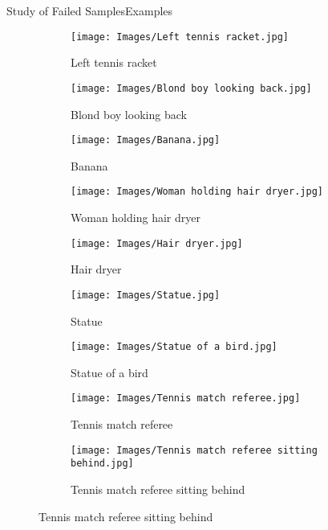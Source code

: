 \documentclass{beamer}
\begin{document}
\begin{frame}{Study of Failed Samples}{Examples}
  \vspace*{-.75cm}
  \begin{figure}
    \begin{subfigure}[t]{.32\textwidth}
      \centering
      \caption{Left tennis racket}\label{fig:racket}
      \texttt{[image: Images/Left tennis racket.jpg]}
    \end{subfigure}\hfill
    \begin{subfigure}[t]{.32\textwidth}
      \centering
      \caption{Blond boy looking back}\label{fig:blond}
      \texttt{[image: Images/Blond boy looking back.jpg]}
    \end{subfigure}\hfill
    \begin{subfigure}[t]{.32\textwidth}
      \centering
      \caption{Banana}\label{fig:banana}
      \texttt{[image: Images/Banana.jpg]}
    \end{subfigure}

    \bigskip
    \begin{subfigure}[t]{.32\textwidth}
      \centering
      \caption{Woman holding hair dryer}\label{fig:dryer-1}
      \texttt{[image: Images/Woman holding hair dryer.jpg]}
    \end{subfigure}\hspace{.1\textwidth}
    \begin{subfigure}[t]{.32\textwidth}
      \centering
      \caption{Hair dryer}\label{fig:dryer-2}
      \texttt{[image: Images/Hair dryer.jpg]}
    \end{subfigure}

    \bigskip
    \begin{subfigure}[t]{.4\textwidth}
      \centering
      \caption{Statue}\label{fig:statue-1}
      \texttt{[image: Images/Statue.jpg]}
    \end{subfigure}\hspace{.06\textwidth}
    \begin{subfigure}[t]{.4\textwidth}
      \centering
      \caption{Statue of a bird}\label{fig:statue-2}
      \texttt{[image: Images/Statue of a bird.jpg]}
    \end{subfigure}

    \bigskip
    \begin{subfigure}[t]{.45\textwidth}
      \centering
      \caption{Tennis match referee}\label{fig:referee-1}
      \texttt{[image: Images/Tennis match referee.jpg]}
    \end{subfigure}\hspace{.05\textwidth}
    \begin{subfigure}[t]{.45\textwidth}
      \centering
      \caption{Tennis match referee sitting behind}\label{fig:referee-2}
      \texttt{[image: Images/Tennis match referee sitting behind.jpg]}
    \end{subfigure}
  \end{figure}
\end{frame}
\end{document}
